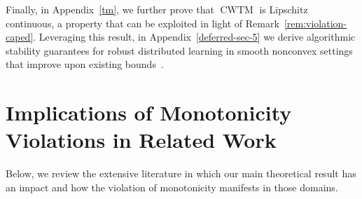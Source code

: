 \documentclass[twoside,11pt]{article}
\begin{document}
Finally, in Appendix~\ref{tm}, we further prove that $\operatorname{CWTM}$ is Lipschitz continuous, a property that can be exploited in light of Remark~\ref{rem:violation-caped}.
Leveraging this result, in Appendix~\ref{deferred-sec-5} we derive algorithmic stability guarantees for robust distributed learning in smooth nonconvex settings that improve upon existing bounds~\cite[Appendix E]{boudou2025generalization}.

\section{Implications of Monotonicity Violations in Related Work}\label{related-work}
Below, we review the extensive literature in which our main theoretical result has an impact and how the violation of monotonicity manifests in those domains.
\end{document}
